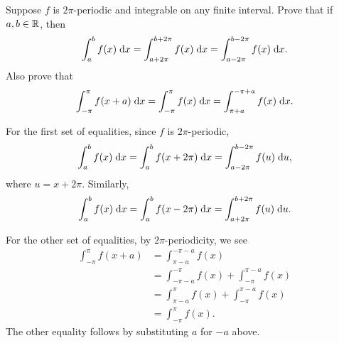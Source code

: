 \begin{exrc}[1]
    Suppose \(f\) is \(2\pi\)-periodic and integrable on any finite interval.
    Prove that if \(a, b \in \mathbb{R}\), then
    \begin{equation*}
        \int_{a}^{b} f(x) \;\mathrm d x = \int_{a + 2\pi}^{b + 2\pi} f(x) \;\mathrm d x
        = \int_{a - 2\pi}^{b - 2\pi} f(x) \;\mathrm d x.
    \end{equation*}
    Also prove that
    \begin{equation*}
        \int_{-\pi}^{\pi} f(x + a) \;\mathrm d x
        = \int_{-\pi}^{\pi} f(x) \;\mathrm d x
        = \int_{\pi + a}^{-\pi + a} f(x) \;\mathrm d x.
    \end{equation*}

\begin{soln}
    For the first set of equalities, since \(f\) is \(2\pi\)-periodic,
    \begin{equation*}
        \int_{a}^{b} f(x) \;\mathrm d x
        = \int_{a}^{b} f(x + 2\pi) \;\mathrm d x
        = \int_{a - 2\pi}^{b - 2\pi} f(u) \;\mathrm d u,
    \end{equation*}
    where \(u = x + 2\pi\).
    Similarly,
    \begin{equation*}
        \int_{a}^{b} f(x) \;\mathrm d x
        = \int_{a}^{b} f(x - 2\pi) \;\mathrm d x
        = \int_{a + 2\pi}^{b + 2\pi} f(u) \;\mathrm d u.
    \end{equation*}

    For the other set of equalities, by \(2\pi\)-periodicity, we see
    \begin{align*}
        \int_{-\pi}^{\pi} f(x + a)
        & = \int_{\pi - a}^{-\pi - a} f(x) \\
        & = \int_{-\pi - a}^{-\pi} f(x) + \int_{-\pi}^{\pi - a} f(x) \\
        & = \int_{\pi - a}^{\pi} f(x) + \int_{-\pi}^{\pi - a} f(x) \\
        & = \int_{-\pi}^{\pi} f(x).
    \end{align*}
    The other equality follows by substituting \(a\) for \(-a\) above.

    


     

\end{soln}
\end{exrc}
